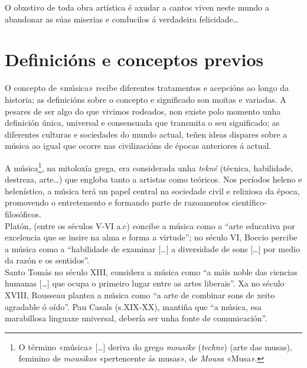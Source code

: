 \documentclass[a4paper, twoside]{templates/ociamthesis}
\begin{document}
\adjustmtc
{}

\begin{savequote}
O obxetivo de toda obra artística é axudar a cantos viven neste mundo a
abandonar as súas miserias e conducilos á verdadeira felicidade\ldots{}
\end{savequote}



\hypertarget{definiciuxf3ns-e-conceptos-previos}{%
\section*{Definicións e conceptos previos}\label{definiciuxf3ns-e-conceptos-previos}}

O concepto de «música» recibe diferentes tratamentos e acepcións ao longo da historia; as definicións sobre o concepto e significado son moitas e variadas. A pesares de ser algo do que vivimos rodeados, non existe polo momento unha definición única, universal e consensuada que transmita o seu significado; as diferentes culturas e sociedades do mundo actual, teñen ideas dispares sobre a música ao igual que ocorre nas civilizacións de épocas anteriores á actual.

A música\footnote{O término «música» {[}\ldots{]} deriva do grego \emph{mousike} (\emph{techne}) (arte das musas), feminino de \emph{mousikos} «pertencente ás musas», de \emph{Mousa} «Musa».}, na mitoloxía grega, era considerada unha \emph{tekné} (técnica, habilidade, destreza, arte\ldots) que engloba tanto a artistas como teóricos. Nos períodos heleno e helenístico, a música terá un papel central na sociedade civil e relixiosa da época, promovendo o entretemento e formando parte de razoamentos científico-filosóficos.\\
Platón, (entre os séculos V-VI a.c) concibe a música como a ``arte educativa por excelencia que se insire na alma e forma a virtude''; no século VI, Boecio percibe a música como a ``habilidade de examinar {[}\ldots{]} a diversidade de sons {[}\ldots{]} por medio da razón e os sentidos''.\\
Santo Tomás no século XIII, considera a música como ``a máis noble das ciencias humanas {[}\ldots{]} que ocupa o primeiro lugar entre as artes liberais''. Xa no século XVIII, Rousseau plantea a música como ``a arte de combinar sons de xeito agradable ó oído''. Pau Casals (s.XIX-XX), mantiña que ``a música, esa marabillosa linguaxe universal, debería ser unha fonte de comunicación''.
\end{document}
